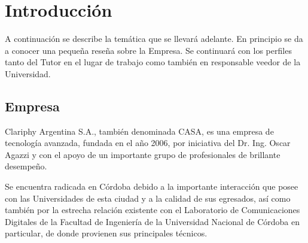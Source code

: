 \documentclass[spanish,a4paper]{article} \usepackage[spanish]{babel}
\begin{document}
\maketitle

\section{Introducción}
\label{sec:Planteo de la PPS}
A continuación se describe la temática que se llevará adelante. En
principio se da a conocer una pequeña reseña sobre la Empresa. Se
continuará con los perfiles tanto del Tutor en el lugar de trabajo
como también en responsable veedor de la Universidad.

\subsection{Empresa}
\label{sec:CASA}

Clariphy Argentina S.A., también denominada CASA, es una empresa de
tecnología avanzada, fundada en el año 2006, por iniciativa del
Dr. Ing. Oscar Agazzi y con el apoyo de un importante grupo de
profesionales de brillante desempeño.


Se encuentra radicada en Córdoba debido a la importante interacción
que posee con las Universidades de esta ciudad y a la calidad de sus
egresados, así como también por la estrecha relación existente con el
Laboratorio de Comunicaciones Digitales de la Facultad de Ingeniería
de la Universidad Nacional de Córdoba en particular, de donde
provienen sus principales técnicos.
\end{document}
